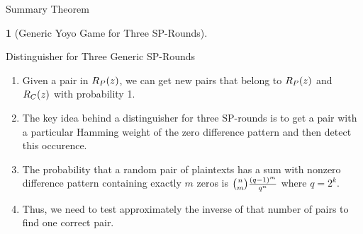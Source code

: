 \documentclass[notheorems]{beamer}
\newtheorem{theorem}{\translate{Theorem}}[section]
\newtheorem{theorem}{\translate{Theorem}}
\theoremstyle{definition}
\theoremstyle{example}
\begin{document}
    \begin{frame}{Summary Theorem}
        \begin{theorem}[Generic Yoyo Game for Three SP-Rounds]
            \label{thm:yoyo-3-rounds}
        \end{theorem}
    \end{frame}
    
    \begin{frame}[<+->]{Distinguisher for Three Generic SP-Rounds}
        \begin{enumerate}
            \item Given a pair in \(R_P(z)\), we can get new pairs that
            belong to \(R_P(z)\) and \(R_C(z)\) with probability 1. 
            \item The key idea behind a distinguisher for three SP-rounds is to
            get a pair with a particular Hamming weight of the zero difference
            pattern and then detect this occurence. 
            \item The probability that a random pair of plaintexts has a sum
            with nonzero difference pattern containing exactly \(m\) zeros is
            \(\binom{n}{m}\frac{(q-1)^m}{q^n}\) where \(q = 2^k\). 
            \item Thus, we need to test approximately the inverse of that number
            of pairs to find one correct pair.
        \end{enumerate}
    \end{frame}
\end{document}
